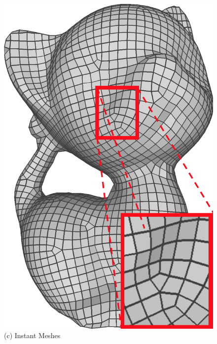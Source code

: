 \begin{figure}
\begin{minipage}{0.16\textwidth}
  \includegraphics[width=\textwidth,height=1.33\textwidth]{quadriflow/result/area02.png}\\
   (c) Instant Meshes
   \end{minipage}
    \begin{minipage}{0.16\textwidth}
     \centering

\end{minipage}
\end{figure}
